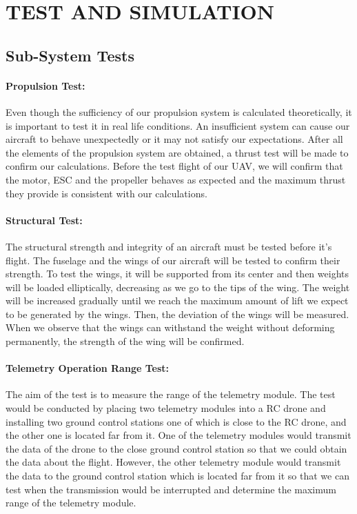 \documentclass[12pt]{article}
\begin{document}
\section{TEST AND SIMULATION}

\subsection{Sub-System Tests}
\paragraph*{Propulsion Test:} Even though the sufficiency of our propulsion system is calculated theoretically, it is important to test it in real life conditions. An insufficient system can cause our aircraft to behave unexpectedly or it may not satisfy our expectations. After all the elements of the propulsion system are obtained, a thrust test will be made to confirm our calculations. Before the test flight of our UAV, we will confirm that the motor, ESC and the propeller behaves as expected and the maximum thrust they provide is consistent with our calculations.

\paragraph*{Structural Test:} The structural strength and integrity of an aircraft must be tested before it’s flight. The fuselage and the wings of our aircraft will be tested to confirm their strength. To test the wings, it will be supported from its center and then weights will be loaded elliptically, decreasing as we go to the tips of the wing. The weight will be increased gradually until we reach the maximum amount of lift we expect to be generated by the wings. Then, the deviation of the wings will be measured. When we observe that the wings can withstand the weight without deforming permanently, the strength of the wing will be confirmed.

\paragraph*{Telemetry Operation Range Test:} The aim of the test is to measure the range of the telemetry module. The test would be conducted by placing two telemetry modules into a RC drone and installing two ground control stations one of which is close to the RC drone, and the other one is located far from it. One of the telemetry modules would transmit the data of the drone to the close ground control station so that we could obtain the data about the flight. However, the other telemetry module would transmit the data to the ground control station which is located far from it so that we can test when the transmission would be interrupted and determine the maximum range of the telemetry module.
\end{document}
